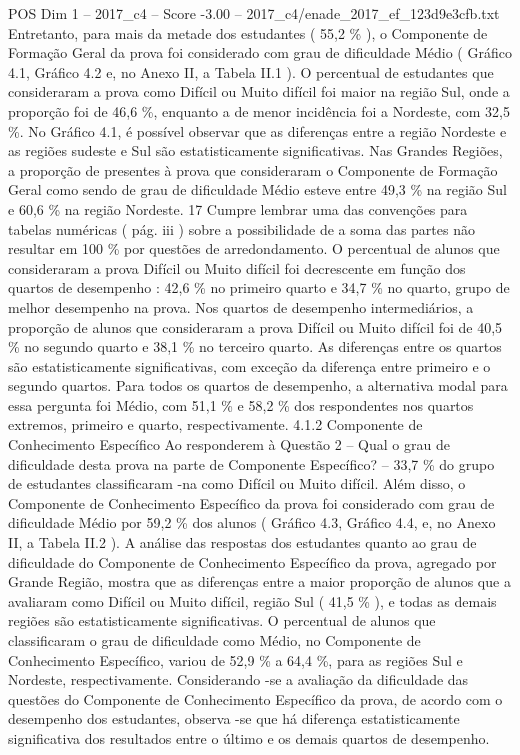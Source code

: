 \begin{textsample}{POS Dim 1 – 2017\_c4 – Score -3.00 – 2017\_c4/enade\_2017\_ef\_123d9e3cfb.txt}
Entretanto, para mais da metade dos estudantes ( 55,2 \% ), o Componente de Formação Geral da prova foi considerado com grau de dificuldade Médio ( Gráfico 4.1, Gráfico 4.2 e, no Anexo II, a Tabela II.1 ).
O percentual de estudantes que consideraram a prova como Difícil ou Muito difícil foi maior na região Sul, onde a proporção foi de 46,6 \%, enquanto a de menor incidência foi a Nordeste, com 32,5 \%.
No Gráfico 4.1, é possível observar que as diferenças entre a região Nordeste e as regiões sudeste e Sul são estatisticamente significativas.
Nas Grandes Regiões, a proporção de presentes à prova que consideraram o Componente de Formação Geral como sendo de grau de dificuldade Médio esteve entre 49,3 \% na região Sul e 60,6 \% na região Nordeste. 17 Cumpre lembrar uma das convenções para tabelas numéricas ( pág. iii ) sobre a possibilidade de a soma das partes não resultar em 100 \% por questões de arredondamento.
O percentual de alunos que consideraram a prova Difícil ou Muito difícil foi decrescente em função dos quartos de desempenho : 42,6 \% no primeiro quarto e 34,7 \% no quarto, grupo de melhor desempenho na prova.
Nos quartos de desempenho intermediários, a proporção de alunos que consideraram a prova Difícil ou Muito difícil foi de 40,5 \% no segundo quarto e 38,1 \% no terceiro quarto.
As diferenças entre os quartos são estatisticamente significativas, com exceção da diferença entre primeiro e o segundo quartos.
Para todos os quartos de desempenho, a alternativa modal para essa pergunta foi Médio, com 51,1 \% e 58,2 \% dos respondentes nos quartos extremos, primeiro e quarto, respectivamente. 4.1.2 Componente de Conhecimento Específico Ao responderem à Questão 2 – Qual o grau de dificuldade desta prova na parte de Componente Específico? – 33,7 \% do grupo de estudantes classificaram -na como Difícil ou Muito difícil.
Além disso, o Componente de Conhecimento Específico da prova foi considerado com grau de dificuldade Médio por 59,2 \% dos alunos ( Gráfico 4.3, Gráfico 4.4, e, no Anexo II, a Tabela II.2 ).
A análise das respostas dos estudantes quanto ao grau de dificuldade do Componente de Conhecimento Específico da prova, agregado por Grande Região, mostra que as diferenças entre a maior proporção de alunos que a avaliaram como Difícil ou Muito difícil, região Sul ( 41,5 \% ), e todas as demais regiões são estatisticamente significativas.
O percentual de alunos que classificaram o grau de dificuldade como Médio, no Componente de Conhecimento Específico, variou de 52,9 \% a 64,4 \%, para as regiões Sul e Nordeste, respectivamente.
Considerando -se a avaliação da dificuldade das questões do Componente de Conhecimento Específico da prova, de acordo com o desempenho dos estudantes, observa -se que há diferença estatisticamente significativa dos resultados entre o último e os demais quartos de desempenho.

\end{textsample}
